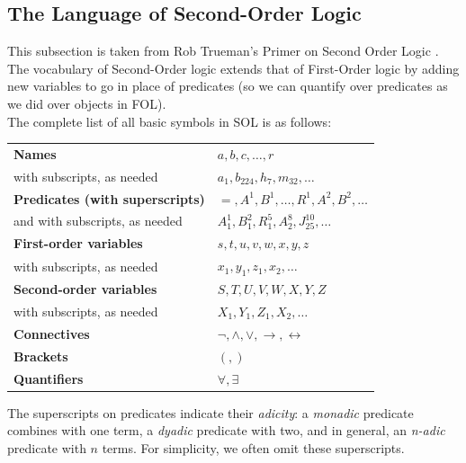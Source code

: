 \subsection{The Language of Second-Order Logic}
This subsection is taken from Rob Trueman's Primer on Second Order Logic \cite{truemanSOL}. The vocabulary of Second-Order logic extends that of First-Order logic by adding new variables to go in place of predicates (so we can quantify over predicates as we did over objects in FOL). \\ \steezybreak
The complete list of all basic symbols in SOL is as follows:
\begin{table}[h]
    \centering
    \begin{tabular}{ll}
        \textbf{Names} & \( a, b, c, \dots, r \) \\
        with subscripts, as needed & \( a_1, b_{224}, h_7, m_{32}, \dots \) \\[8pt]

        \textbf{Predicates (with superscripts)} & \( =, A^1, B^1, \dots, R^1, A^2, B^2, \dots \) \\
        and with subscripts, as needed & \( A_1^1, B_1^2, R_1^5, A_2^8, J_{25}^{10}, \dots \) \\[8pt]

        \textbf{First-order variables} & \( s, t, u, v, w, x, y, z \) \\
        with subscripts, as needed & \( x_1, y_1, z_1, x_2, \dots \) \\[8pt]

        \textbf{Second-order variables} & \( S, T, U, V, W, X, Y, Z \) \\
        with subscripts, as needed & \( X_1, Y_1, Z_1, X_2, \dots \) \\[8pt]

        \textbf{Connectives} & \( \neg, \wedge, \vee, \rightarrow, \leftrightarrow \) \\[8pt]

        \textbf{Brackets} & \( (, ) \) \\[8pt]

        \textbf{Quantifiers} & \( \forall, \exists \)
    \end{tabular}
\end{table}

The superscripts on predicates indicate their \textit{adicity}: a \textit{monadic} predicate combines with one term, a \textit{dyadic} predicate with two, and in general, an \textit{n-adic} predicate with $n$ terms. For simplicity, we often omit these superscripts.

